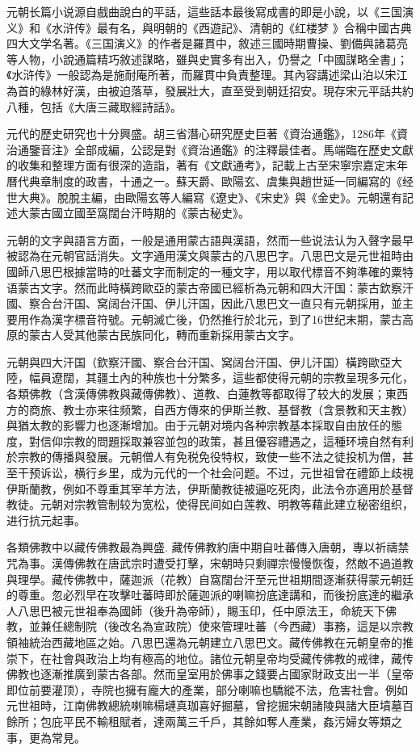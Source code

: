 元朝长篇小说源自戲曲說白的平話，這些話本最後寫成書的即是小說，以《三国演义》和《水浒传》最有名，與明朝的《西遊記》、清朝的《红楼梦 》合稱中國古典四大文学名著。《三国演义》的作者是羅貫中，敘述三國時期曹操、劉備與諸葛亮等人物，小說通篇精巧敘述謀略，雖與史實多有出入，仍譽之「中國謀略全書」；《水浒传》一般認為是施耐庵所著，而羅貫中負責整理。其內容講述梁山泊以宋江為首的綠林好漢，由被迫落草，發展壯大，直至受到朝廷招安。現存宋元平話共約八種，包括《大唐三藏取經詩話》。

元代的歷史研究也十分興盛。胡三省潛心研究歷史巨著《資治通鑑》，1286年《資治通鑒音注》全部成編，公認是對《資治通鑑》的注釋最佳者。馬端臨在歷史文獻的收集和整理方面有很深的造詣，著有《文獻通考》，記載上古至宋寧宗嘉定末年曆代典章制度的政書，十通之一。蘇天爵、歐陽玄、虞集與趙世延一同編寫的《经世大典》。脫脫主編，由歐陽玄等人編寫《遼史》、《宋史》與《金史》。元朝還有記述大蒙古國立國至窩闊台汗時期的《蒙古秘史》。

元朝的文字與語言方面，一般是通用蒙古語與漢語，然而一些说法认为入聲字最早被認為在元朝官話消失。文字通用漢文與蒙古的八思巴字。八思巴文是元世祖時由國師八思巴根據當時的吐蕃文字而制定的一種文字，用以取代標音不夠準確的粟特语蒙古文字。然而此時橫跨歐亞的蒙古帝國已經析為元朝和四大汗国：蒙古欽察汗國、察合台汗国、窝阔台汗国、伊儿汗国，因此八思巴文一直只有元朝採用，並主要用作為漢字標音符號。元朝滅亡後，仍然推行於北元，到了16世纪末期，蒙古高原的蒙古人受其他蒙古民族同化，轉而重新採用蒙古文字。

元朝與四大汗国（欽察汗國、察合台汗国、窝阔台汗国、伊儿汗国）橫跨歐亞大陸，幅員遼闊，其疆土內的种族也十分繁多，這些都使得元朝的宗教呈現多元化，各類佛教（含漢傳佛教與藏傳佛教）、道教、白蓮教等都取得了较大的发展；東西方的商旅、教士亦来往频繁，自西方傳來的伊斯兰教、基督教（含景教和天主教）與猶太教的影響力也逐漸增加。由于元朝对境内各种宗教基本採取自由放任的態度，對信仰宗教的問題採取兼容並包的政策，甚且優容禮遇之，這種环境自然有利於宗教的傳播與發展。元朝僧人有免税免役特权，致使一些不法之徒投机为僧，甚至干预诉讼，横行乡里，成为元代的一个社会问题。不过，元世祖曾在禮節上歧視伊斯蘭教，例如不尊重其宰羊方法，伊斯蘭教徒被逼吃死肉，此法令亦適用於基督教徒。元朝对宗教管制较为宽松，使得民间如白莲教、明教等藉此建立秘密组织，进行抗元起事。

各類佛教中以藏传佛教最為興盛. 藏传佛教約唐中期自吐蕃傳入唐朝，專以祈禱禁咒為事。漢傳佛教在唐武宗时遭受打擊，宋朝時只剩禪宗慢慢恢復，然敵不過道教與理學。藏传佛教中，薩迦派（花教）自窩闊台汗至元世祖期間逐漸获得蒙元朝廷的尊重。忽必烈早在攻擊吐蕃時即於薩迦派的喇嘛扮底達講和，而後扮底達的繼承人八思巴被元世祖奉為國師（後升為帝師），賜玉印，任中原法王，命統天下佛教，並兼任總制院（後改名為宣政院）使來管理吐蕃（今西藏）事務，這是以宗教領袖統治西藏地區之始。八思巴還為元朝建立八思巴文。藏传佛教在元朝皇帝的推崇下，在社會與政治上均有極高的地位。諸位元朝皇帝均受藏传佛教的戒律，藏传佛教也逐漸推廣到蒙古各部。然而皇室用於佛事之錢要占國家財政支出一半（皇帝即位前要灌顶），寺院也擁有龐大的產業，部分喇嘛也驕縱不法，危害社會。例如元世祖時，江南佛教總統喇嘛楊璉真珈喜好掘墓，曾挖掘宋朝諸陵與諸大臣墳墓百餘所；包庇平民不輸租賦者，達兩萬三千戶，其餘如奪人產業，姦污婦女等類之事，更為常見。

